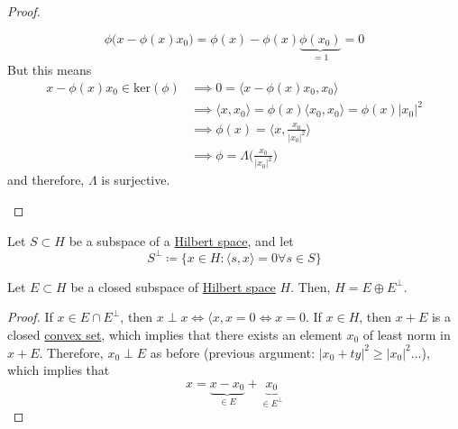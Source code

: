 \begin{proof}
\begin{enumerate}
				\begin{equation}
					\phi\big( x - \phi(x) x_0 \big) = \phi(x) - \phi(x) \underbrace{\phi(x_0)}_{=1} = 0
				\end{equation}
				But this means 
				\begin{align}
					x - \phi (x) x_0 \in \mathrm{ker}(\phi) 
						& \implies 0 = \langle x - \phi(x) x_0, x_0 \rangle \\ 
						& \implies \langle x, x_0 \rangle = \phi(x) \langle x_0, x_0 \rangle = \phi(x) |x_0|^2 \\ 
						& \implies \phi(x) = \bigg\langle x, \frac{x_0}{|x_0|^2} \bigg\rangle \\ 
						& \implies \phi = \Lambda \bigg( \frac{x_0}{|x_0|^2} \bigg)
				\end{align}
				and therefore, $\Lambda$ is surjective. 
		\end{enumerate} 
	\end{proof}

	\begin{definition}
	  \label{def:orthogonal-subspace}
	  Let $S \subset H$ be a subspace of a \hyperref[def:hilbert-space]{Hilbert space}, and let 
		\begin{equation}
			S^\perp \coloneqq \{x \in H \colon \langle s, x \rangle = 0 \forall s \in S\}
		\end{equation} 
	\end{definition}


	\begin{theorem}[1.4.6]
	  \label{thm:1-4-6}
	  Let $E \subset H$ be a closed subspace of \hyperref[def:hilbert-space]{Hilbert space} $H$. Then, $H = E \oplus E^\perp$. 
	\end{theorem}
	\begin{proof}
	  If $x \in E \cap E^\perp$, then $x \perp x \iff \langle x, x = 0 \iff x = 0$. If $x \in H$, then $x + E$ is a closed \hyperref[mv-def:convex-set]{convex set}, which implies that there exists an element $x_0$ of least norm in $x + E$. Therefore, $x_0 \perp E$ as before (previous argument: $|x_0 + ty|^2 \geq |x_0|^2$...), which implies that 
		\begin{equation}
			x = \underbrace{x - x_0}_{\in E} + \underbrace{x_0}_{\in E^\perp}
		\end{equation}
	\end{proof}

